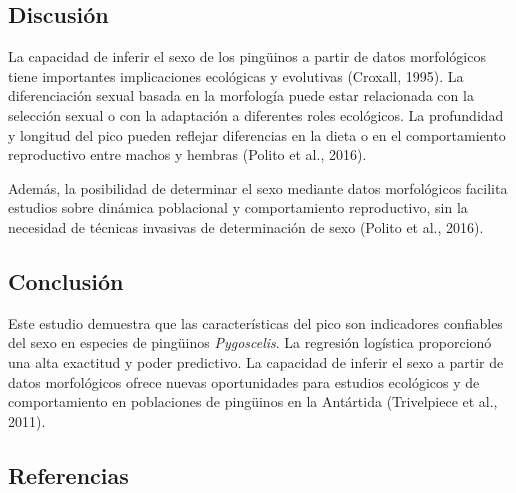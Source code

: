 \documentclass[
]{agujournal2019}
\begin{document}
\subsection{Discusión}\label{discusiuxf3n}

La capacidad de inferir el sexo de los pingüinos a partir de datos
morfológicos tiene importantes implicaciones ecológicas y evolutivas
(Croxall, 1995). La diferenciación sexual basada en la morfología puede
estar relacionada con la selección sexual o con la adaptación a
diferentes roles ecológicos. La profundidad y longitud del pico pueden
reflejar diferencias en la dieta o en el comportamiento reproductivo
entre machos y hembras (Polito et al., 2016).

Además, la posibilidad de determinar el sexo mediante datos morfológicos
facilita estudios sobre dinámica poblacional y comportamiento
reproductivo, sin la necesidad de técnicas invasivas de determinación de
sexo (Polito et al., 2016).

\subsection{Conclusión}\label{conclusiuxf3n}

Este estudio demuestra que las características del pico son indicadores
confiables del sexo en especies de pingüinos \emph{Pygoscelis}. La
regresión logística proporcionó una alta exactitud y poder predictivo.
La capacidad de inferir el sexo a partir de datos morfológicos ofrece
nuevas oportunidades para estudios ecológicos y de comportamiento en
poblaciones de pingüinos en la Antártida (Trivelpiece et al., 2011).

\subsection*{Referencias}\label{referencias}
\end{document}
